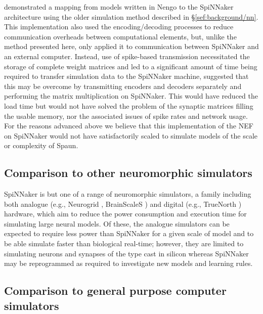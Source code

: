 \documentclass[conference]{IEEEtran}
\begin{document}
  \textcite{Galluppi2012} demonstrated a mapping from models written in Nengo to the SpiNNaker architecture using the older simulation method described in \S\ref{sef:background/nn}.
  This implementation also used the encoding/decoding processes to reduce communication overheads between computational elements, but, unlike the method presented here, only applied it to communication between SpiNNaker and an external computer.
  Instead, use of spike-based transmission necessitated the storage of complete weight matrices and led to a significant amount of time being required to transfer simulation data to the SpiNNaker machine, \citeauthor{Galluppi2012} suggested that this may be overcome by transmitting encoders and decoders separately and performing the matrix multiplication on SpiNNaker.
  This would have reduced the load time but would not have solved the problem of the synaptic matrices filling the usable memory, nor the associated issues of spike rates and network usage.
  For the reasons advanced above we believe that this implementation of the NEF on SpiNNaker would not have satisfactorily scaled to simulate models of the scale or complexity of Spaun.

  \subsection{Comparison to other neuromorphic simulators}

  SpiNNaker is but one of a range of neuromorphic simulators, a family including both analogue (e.g., Neurogrid \parencite{Benjamin2014}, BrainScaleS \parencite{Schemmel2010}) and digital (e.g., TrueNorth \parencite{Merolla2014}) hardware, which aim to reduce the power consumption and execution time for simulating large neural models.
  Of these, the analogue simulators can be expected to require less power than SpiNNaker for a given scale of model \parencite{Stromatias2013} and to be able simulate faster than biological real-time; however, they are limited to simulating neurons and synapses of the type cast in silicon whereas SpiNNaker may be reprogrammed as required to investigate new models and learning rules.

  \subsection{Comparison to general purpose computer simulators}
\end{document}
